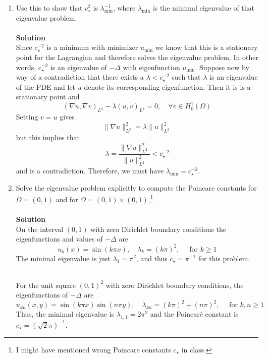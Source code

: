 \documentclass[11pt]{article}
\begin{document}
\begin{enumerate}
\begin{enumerate}




  \item Use this to show that $c_\star^2$ is $\lambda_{\min}^{-1}$, where
    $\lambda_{\min}$ is the minimal eigenvalue of that eigenvalue
    problem.\\
\\

{\bf Solution}\\
Since $c_{\star}^{-2}$ is a minimum with minimizer $u_{\min}$ we know that this is a stationary point for the Lagrangian and therefore solves the eigenvalue problem.  In other words, $c_{\star}^{-2}$ is an eigenvalue of $-\Delta$ with eigenfunction $u_{\min}$.  Suppose now by way of a contradiction that there exists a $\lambda < c_{\star}^{-2}$ such that $\lambda$ is an eigenvalue of the PDE and let $u$ denote its corresponding eigenfunction.  Then it is is a stationary point and 
\[
(\nabla u,\nabla v)_{L^2} - \lambda (u,v)_{L^2} = 0, \quad \forall v\in H_0^1(\Omega)
\]
Setting $v = u$ gives
\[
\|\nabla u\|_{L^2}^2 = \lambda \|u\|_{L^2}^2
\]
but this implies that
\[
\lambda = \frac{\|\nabla u\|_{L^2}^2 }{\| u\|_{L^2}^2 } < c_{\star}^{-2}
\]
and is a contradiction.  Therefore, we must have $\lambda_{\min} = c_{\star}^{-2}$.





  \item Solve the eigenvalue problem explicitly to compute the
    Poincare constants for $\Omega=(0,1)$ and for $\Omega=(0,1)\times
    (0,1)$.\footnote{I might have mentioned wrong Poincare constants
      $c_\star$ in class.}\\
\\

{\bf Solution}\\
On the interval $(0,1)$ with zero Dirichlet boundary conditions the eigenfunctions and values of $-\Delta$ are
\[
u_k(x) = \sin(k\pi x), \quad \lambda_k = (k\pi)^2, \quad \text{ for } k \ge 1
\]
The minimal eigenvalue is just $\lambda_1 = \pi^2$, and thus $c_{\star} = \pi^{-1}$ for this problem.\\
\\
\par For the unit square $(0,1)^2$ with zero Dirichlet boundary conditions, the eigenfunctions of $-\Delta$ are
\[
u_{kn}(x,y) = \sin(k\pi x)\sin(n\pi y), \quad \lambda_{kn} = (k\pi)^2 + (n\pi)^2,\quad \text{ for } k,n \ge 1
\]
Thus, the minimal eigenvalue is $\lambda_{1,1} = 2\pi^2$ and the Poincar{\'e} constant is $c_{\star} = (\sqrt{2}\pi)^{-1}$.



\end{enumerate}
\end{enumerate}
\end{document}
